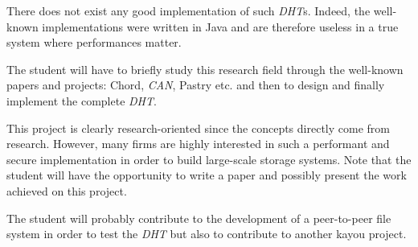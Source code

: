 \begin{multicols}{2}
There does not exist any good implementation of such \textit{DHT}s. Indeed,
the well-known implementations were written in Java and are therefore
useless in a true system where performances matter.

The student will have to briefly study this research field through the
well-known papers and projects: Chord, \textit{CAN}, Pastry etc. and then
to design and finally implement the complete \textit{DHT}.

This project is clearly research-oriented since the concepts directly come
from research. However, many firms are highly interested in such a
performant and secure implementation in order to build large-scale storage
systems. Note that the student will have the opportunity to write a paper and
possibly present the work achieved on this project.

The student will probably contribute to the development of a peer-to-peer
file system in order to test the \textit{DHT} but also to contribute to
another kayou project.

\end{multicols}


